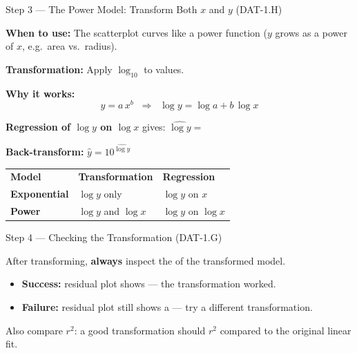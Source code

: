\documentclass[10pt]{article}
\begin{document}
\begin{notesbox}{Step 3 --- The Power Model: Transform Both $x$ and $y$ (DAT-1.H)}
\small

\noindent \textbf{When to use:} The scatterplot curves like a power function ($y$ grows as a
power of $x$, e.g.\ area vs.\ radius).

\vspace{6pt}
\textbf{Transformation:} Apply $\log_{10}$ to  values.

\vspace{4pt}
\textbf{Why it works:}
\[
  y = a\,x^b
  \;\;\Longrightarrow\;\;
  \log y = \log a + b\,\log x
\]

\vspace{6pt}
\textbf{Regression of $\log y$ on $\log x$} gives: \quad $\widehat{\log y} = $ 

\vspace{6pt}
\textbf{Back-transform:} \quad $\hat{y} = 10^{\widehat{\log y}}$

\vspace{6pt}
\renewcommand{\arraystretch}{1.6}
\begin{tabularx}{\linewidth}{@{} >{\bfseries}p{3cm} X X @{}}
\rowcolor{sky} \textbf{Model} & \textbf{Transformation} & \textbf{Regression} \\
Exponential & $\log y$ only & $\log y$ on $x$ \\
Power       & $\log y$ and $\log x$ & $\log y$ on $\log x$ \\
\end{tabularx}

\end{notesbox}

\vspace{0.1in}

\begin{notesbox}{Step 4 --- Checking the Transformation (DAT-1.G)}
\small

\noindent After transforming, \textbf{always} inspect the  of the
transformed model.

\vspace{4pt}
\begin{itemize}[itemsep=3pt]
  \item \textbf{Success:} residual plot shows  --- the transformation worked.
  \item \textbf{Failure:} residual plot still shows a  --- try a different transformation.
\end{itemize}

\vspace{6pt}
Also compare \textbf{$r^2$}: a good transformation should  $r^2$ compared to
the original linear fit.

\end{notesbox}
\end{document}
